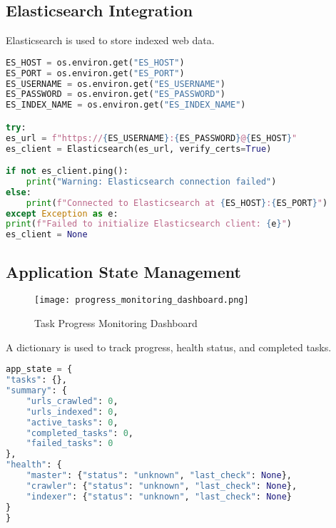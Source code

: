 \documentclass[12pt,a4paper]{report}
\begin{document}
\subsection{Elasticsearch Integration}
Elasticsearch is used to store indexed web data.
\begin{lstlisting}[language=Python]
ES_HOST = os.environ.get("ES_HOST")
ES_PORT = os.environ.get("ES_PORT")
ES_USERNAME = os.environ.get("ES_USERNAME")
ES_PASSWORD = os.environ.get("ES_PASSWORD")
ES_INDEX_NAME = os.environ.get("ES_INDEX_NAME")

try:
es_url = f"https://{ES_USERNAME}:{ES_PASSWORD}@{ES_HOST}"
es_client = Elasticsearch(es_url, verify_certs=True)

if not es_client.ping():
    print("Warning: Elasticsearch connection failed")
else:
    print(f"Connected to Elasticsearch at {ES_HOST}:{ES_PORT}")
except Exception as e:
print(f"Failed to initialize Elasticsearch client: {e}")
es_client = None
\end{lstlisting}

\subsection{Application State Management}
\begin{figure}[htb!]
    \centering
    \texttt{[image: progress\_monitoring\_dashboard.png]}
    \caption{Task Progress Monitoring Dashboard}
    \label{fig:progress-dashboard}
\end{figure}

A dictionary is used to track progress, health status, and completed tasks.
\begin{lstlisting}[language=Python]
app_state = {
"tasks": {},
"summary": {
    "urls_crawled": 0,
    "urls_indexed": 0,
    "active_tasks": 0,
    "completed_tasks": 0,
    "failed_tasks": 0
},
"health": {
    "master": {"status": "unknown", "last_check": None},
    "crawler": {"status": "unknown", "last_check": None},
    "indexer": {"status": "unknown", "last_check": None}
}
}
\end{lstlisting}
\newpage
\end{document}
